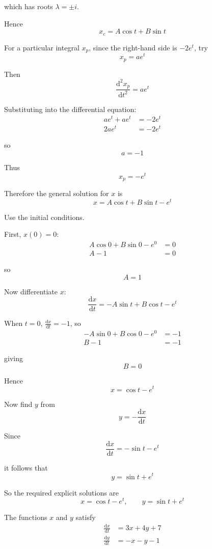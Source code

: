 \documentclass[leqno]{article}
\begin{document}
\begin{enumerate}[
  label=\textbf{\arabic*.},
  leftmargin=*,
  topsep=0pt,
  partopsep=0pt,
  parsep=0pt
]
\begin{djsSolution}
which has roots $\lambda=\pm i$.

Hence
\[
x_c=A\cos t+B\sin t
\]

For a particular integral $x_p$, since the right-hand side is $-2e^t$, try
\[
x_p=ae^t
\]

Then
\[
\frac{\mathrm{d}^2x_p}{\mathrm{d}t^2}=ae^t
\]

Substituting into the differential equation:
\begin{align*}
ae^t+ae^t&=-2e^t \\
2ae^t&=-2e^t
\end{align*}

so
\[
a=-1
\]

Thus
\[
x_p=-e^t
\]

Therefore the general solution for $x$ is
\[
x=A\cos t+B\sin t-e^t
\]

Use the initial conditions.

First, $x(0)=0$:
\begin{align*}
A\cos 0+B\sin 0-e^0&=0 \\
A-1&=0
\end{align*}

so
\[
A=1
\]

Now differentiate $x$:
\[
\frac{\mathrm{d}x}{\mathrm{d}t}=-A\sin t+B\cos t-e^t
\]

When $t=0$, $\frac{\mathrm{d}x}{\mathrm{d}t}=-1$, so
\begin{align*}
-A\sin 0+B\cos 0-e^0&=-1 \\
B-1&=-1
\end{align*}

giving
\[
B=0
\]

Hence
\[
x=\cos t-e^t
\]

Now find $y$ from
\[
y=-\frac{\mathrm{d}x}{\mathrm{d}t}
\]

Since
\[
\frac{\mathrm{d}x}{\mathrm{d}t}=-\sin t-e^t
\]

it follows that
\[
y=\sin t+e^t
\]

So the required explicit solutions are
\[
x=\cos t-e^t, \qquad y=\sin t+e^t
\]
\end{djsSolution}


\newpage

\questionitem

The functions $x$ and $y$ satisfy \\
\[
\begin{aligned}
\frac{\mathrm{d}x}{\mathrm{d}t} &= 3x+4y+7 \\[5pt]
\frac{\mathrm{d}y}{\mathrm{d}t} &= -x-y-1
\end{aligned}
\] \\


\end{enumerate}
\end{document}
